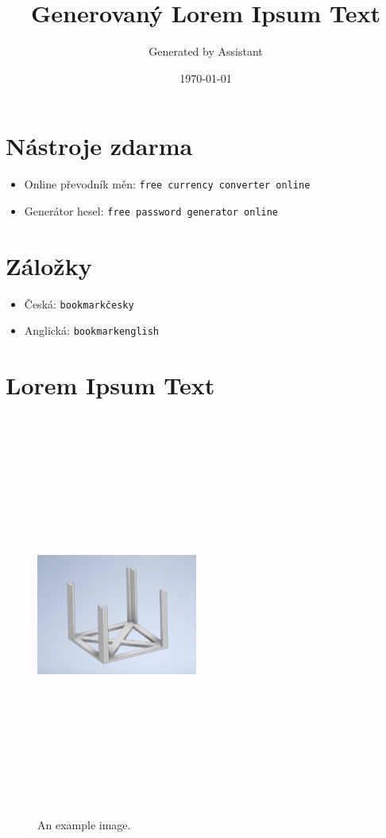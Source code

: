 \documentclass[a4paper, 12pt]{article}
\title{Generovaný Lorem Ipsum Text}
\author{Generated by Assistant}
\date{\today}
\begin{document}
\maketitle

\section*{Nástroje zdarma}
\begin{itemize}
    \item Online převodník měn: \texttt{free currency converter online}
    \item Generátor hesel: \texttt{free password generator online}
\end{itemize}

\section*{Záložky}
\begin{itemize}
    \item Česká: \texttt{bookmarkčesky}
    \item Anglická: \texttt{bookmarkenglish}
\end{itemize}

\section*{Lorem Ipsum Text}

\begin{figure}[ht]
    \centering
    \includegraphics[width=200px,height=500px,keepaspectratio]{img/instalace_rozvadec_konstrukce_01.png}
    \caption{An example image.}
\end{figure}
\end{document}
